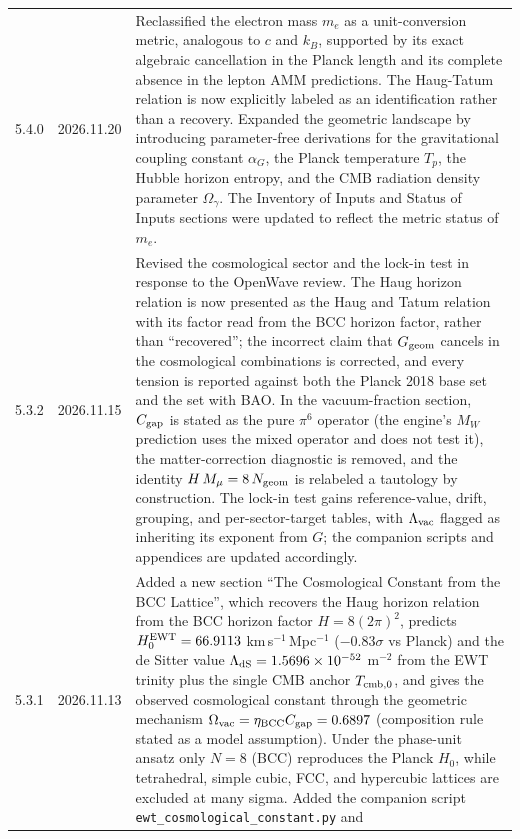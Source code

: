 \documentclass[10pt,a4paper]{article}
\begin{document}
\begin{longtable}{@{}p{1.6cm}p{1.8cm}p{10.1cm}@{}}
	5.4.0 & 2026.11.20 &
	Reclassified the electron mass \(m_e\) as a unit-conversion metric, 
	analogous to \(c\) and \(k_B\), supported by its exact algebraic 
	cancellation in the Planck length and its complete absence in the 
	lepton AMM predictions. The Haug-Tatum relation is now explicitly 
	labeled as an identification rather than a recovery. Expanded the 
	geometric landscape by introducing parameter-free derivations for 
	the gravitational coupling constant \(\alpha_G\), the Planck 
	temperature \(T_p\), the Hubble horizon entropy, and the CMB radiation 
	density parameter \(\Omega_\gamma\). The Inventory of Inputs and 
	Status of Inputs sections were updated to reflect the metric status 
	of \(m_e\). \\
	5.3.2 & 2026.11.15 &
	Revised the cosmological sector and the lock-in test in response to the
	OpenWave review. The Haug horizon relation is now presented as the Haug
	and Tatum relation with its factor read from the BCC horizon factor,
	rather than ``recovered''; the incorrect claim that \(G_{\rm geom}\)
	cancels in the cosmological combinations is corrected, and every
	tension is reported against both the Planck 2018 base set and the set
	with BAO. In the vacuum-fraction section, \(C_{\rm gap}\) is stated as
	the pure \(\pi^6\) operator (the engine's \(M_W\) prediction uses the
	mixed operator and does not test it), the matter-correction diagnostic
	is removed, and the identity \(H\,M_\mu = 8\,N_{\rm geom}\) is
	relabeled a tautology by construction. The lock-in test gains
	reference-value, drift, grouping, and per-sector-target tables, with
	\(\Lambda_{\rm vac}\) flagged as inheriting its exponent from \(G\);
	the companion scripts and appendices are updated accordingly. \\
	5.3.1 & 2026.11.13 &
	Added a new section ``The Cosmological Constant from the BCC Lattice'', which recovers the Haug horizon
	relation from the BCC horizon factor \(H = 8(2\pi)^2\), predicts
	\(H_0^{\rm EWT} = 66.9113\) km\,s\(^{-1}\)\,Mpc\(^{-1}\) (\(-0.83\sigma\)
	vs Planck) and the de Sitter value
	\(\Lambda_{\rm dS} = 1.5696\times 10^{-52}\) m\(^{-2}\) from the EWT
	trinity plus the single CMB anchor \(T_{\rm cmb,0}\), and gives the
	observed cosmological constant through the geometric mechanism
	\(\Omega_{\rm vac} = \eta_{\rm BCC} C_{\rm gap} = 0.6897\) (composition
	rule stated as a model assumption). Under the phase-unit ansatz only
	\(N=8\) (BCC) reproduces the Planck \(H_0\), while tetrahedral, simple
	cubic, FCC, and hypercubic lattices are excluded at many sigma.
	Added the companion script \texttt{ewt\_cosmological\_constant.py} and

\end{longtable}
\end{document}
